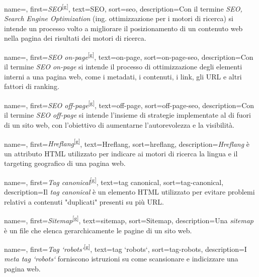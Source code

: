
 {
    name=,
    first={\textit{SEO}\textsuperscript{[g]}},
    text=SEO,
    sort=seo,
    description={Con il termine \emph{SEO, Search Engine Optimization} (ing. ottimizzazione per i motori di ricerca) si intende un processo volto a migliorare il posizionamento di un contenuto web nella pagina dei risultati dei motori di ricerca.}
}

 {
    name=,
    first={\textit{SEO on-page}\textsuperscript{[g]}},
    text=on-page,
    sort=on-page-seo,
    description={Con il termine \emph{SEO on-page} si intende il processo di ottimizzazione degli elementi interni a una pagina web, come i metadati, i contenuti, i link, gli URL e altri fattori di ranking.}
}

 {
    name=,
    first={\textit{SEO off-page}\textsuperscript{[g]}},
    text=off-page,
    sort=off-page-seo,
    description={Con il termine \emph{SEO off-page} si intende l'insieme di strategie implementate al di fuori di un sito web, con l'obiettivo di aumentarne l'autorevolezza e la visibilità.}
}

 {
    name=,
    first={\textit{Hreflang}\textsuperscript{[g]}},
    text=Hreflang,
    sort=hreflang,
    description={\emph{Hreflang} è un attributo HTML utilizzato per indicare ai motori di ricerca la lingua e il targeting geografico di una pagina web.}
}

 {
    name=,
    first={\textit{Tag canonical}\textsuperscript{[g]}},
    text=tag canonical,
    sort=tag-canonical,
    description={Il \emph{tag canonical} è un elemento HTML utilizzato per evitare problemi relativi a contenuti "duplicati" presenti su più URL.}
}

 {
    name=,
    first={\textit{Sitemap}\textsuperscript{[g]}},
    text=sitemap,
    sort=Sitemap,
    description={Una \emph{sitemap} è un file che elenca gerarchicamente le pagine di un sito web.}
}

 {
    name=,
    first={\textit{Tag `robots`}\textsuperscript{[g]}},
    text=tag `robots`,
    sort=tag-robots,
    description={I \emph{meta tag `robots`} forniscono istruzioni su come scansionare e indicizzare una pagina web.}
}

